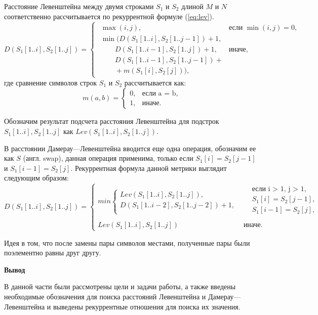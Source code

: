 Расстояние Левенштейна между двумя строками $S_{1}$ и $S_{2}$ длиной $M$ и $N$ соответственно рассчитывается по рекуррентной формуле (\ref{eq:lev}).
\small
\begin{equation}
	\label{eq:lev}
	D(S_{1}[1..i],S_{2}[1..j]) = 
	\begin{cases}
		\begin{array}{ll}
			\max(i,j), & \textrm{$\mbox{если }\min(i,j) = 0,$}\\
			\min(D(S_{1}[1..i], S_{2}[1.. j - 1])+1,\\
			\qquad D(S_{1}[1..i - 1], S_{2}[1..j]) + 1, &\textrm{$\mbox{иначе},$}\\
			\qquad D(S_{1}[1..i - 1], S_{2}[1..j - 1]) +\\
			\qquad + m(S_{1}[i],S_{2}[j])),
		\end{array}
	\end{cases}
\end{equation}
где сравнение символов строк $S_{1}$ и $S_{2}$ рассчитывается как:
\small
\begin{equation}
	\label{eq:m}
	m(a, b) = \begin{cases}
		0, &\text{если a = b,}\\
		1, &\text{иначе.}
	\end{cases}
\end{equation}


Обозначим результат подсчета расстояния Левенштейна для подстрок $S_{1}[1..i],S_{2}[1..j]$ как 
$Lev(S_{1}[1..i],S_{2}[1..j])$.





В расстоянии Дамерау---Левенштейна вводится еще одна операция, обозначим ее как $S$ (англ. swap), данная операция применима, только  если $S_{1}[i] = S_{2}[j - 1]$
и $S_{1}[i - 1] = S_{2}[j]$. Рекуррентная формула  данной метрики выглядит следующим образом:
\small
\begin{equation}
	\label{eq:DL}
	D(S_{1}[1..i],S_{2}[1..j]) = 
	\begin{cases}
		min \begin{cases}
			Lev(S_{1}[1..i],S_{2}[1..j]),\\
			D(S_{1}[1..i - 2],S_{2}[1..j - 2]) + 1, \\
		\end{cases}
		& \begin{aligned}
			& \text{если i > 1, j > 1}, \\
			& S_{1}[i] = S_{2}[j - 1], \\
			& S_{1}[i - 1] = S_{2}[j], \\
		\end{aligned}\\
		Lev(S_{1}[1..i],S_{2}[1..j])
		 & \text{иначе.}
	\end{cases}
\end{equation}

Идея в том, что после замены пары символов местами, полученные пары были поэлементно равны друг другу.

\textbf{Вывод}

В данной части  были рассмотрены цели и задачи работы, а также введены необходимые обозначения для поиска расстояний Левенштейна и Дамерау---Левенштейна
и выведены рекуррентные отношения для поиска их значения.

